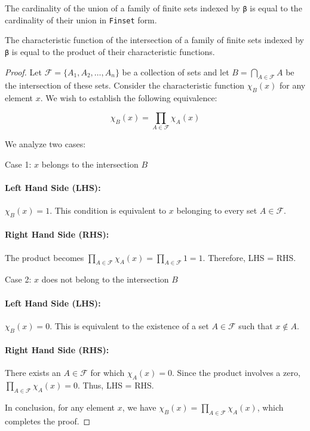 \begin{lemma}\label{card_eq_FinUnion}
  The cardinality of the union of a family of finite sets indexed by \verb|β| is equal to the cardinality of their union in \verb|Finset| form.
\end{lemma}

\begin{lemma}\label{char_fun_FinInter}
  \leanok
  The characteristic function of the intersection of a family of finite sets indexed by \verb|β| is equal to the product of their characteristic functions.
\end{lemma}

\begin{proof}
  \leanok
  Let $\mathcal{F} = \{A_1, A_2, \ldots, A_n\}$ be a collection of sets and let $B = \bigcap_{A \in \mathcal{F}} A$ be the intersection of these sets. Consider the characteristic function $\chi_B(x)$ for any element $x$. We wish to establish the following equivalence:

  \begin{equation*}
  \chi_B(x) = \prod_{A \in \mathcal{F}} \chi_A(x)
  \end{equation*}

  We analyze two cases:

  Case 1: $x$ belongs to the intersection $B$

  \paragraph{Left Hand Side (LHS):} $\chi_B(x) = 1$. This condition is equivalent to $x$ belonging to every set $A \in \mathcal{F}$.

  \paragraph{Right Hand Side (RHS):} The product becomes $\prod_{A \in \mathcal{F}} \chi_A(x) = \prod_{A \in \mathcal{F}} 1 = 1$. Therefore, LHS = RHS.

  Case 2: $x$ does not belong to the intersection $B$

  \paragraph{Left Hand Side (LHS):} $\chi_B(x) = 0$. This is equivalent to the existence of a set $A \in \mathcal{F}$ such that $x \not\in A$.

  \paragraph{Right Hand Side (RHS):} There exists an $A \in \mathcal{F}$ for which $\chi_A(x) = 0$. Since the product involves a zero, $\prod_{A \in \mathcal{F}} \chi_A(x) = 0$. Thus, LHS = RHS.

  In conclusion, for any element $x$, we have $\chi_B(x) = \prod_{A \in \mathcal{F}} \chi_A(x)$, which completes the proof.

\end{proof}

